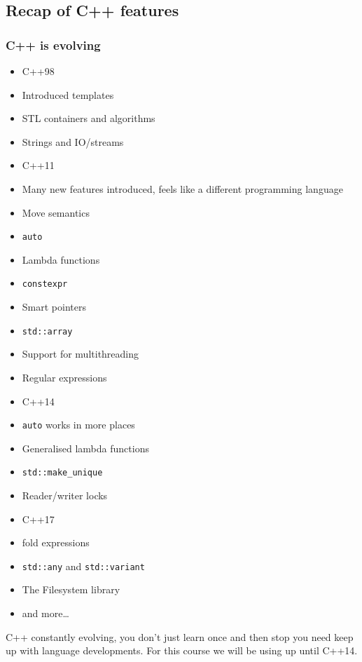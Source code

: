 \subsection{Recap of C++ features}\label{recap-of-c-features}

\subsubsection{C++ is evolving}\label{c-is-evolving}

\begin{itemize}
\itemsep1pt\parskip0pt
\item
  C++98
\item
  Introduced templates
\item
  STL containers and algorithms
\item
  Strings and IO/streams\\
\item
  C++11
\item
  Many new features introduced, feels like a different programming
  language
\item
  Move semantics
\item
  \texttt{auto}
\item
  Lambda functions
\item
  \texttt{constexpr}
\item
  Smart pointers
\item
  \texttt{std::array}
\item
  Support for multithreading
\item
  Regular expressions
\item
  C++14
\item
  \texttt{auto} works in more places
\item
  Generalised lambda functions
\item
  \texttt{std::make\_unique}
\item
  Reader/writer locks
\item
  C++17
\item
  fold expressions
\item
  \texttt{std::any} and \texttt{std::variant}
\item
  The Filesystem library
\item
  and more\ldots{}
\end{itemize}

C++ constantly evolving, you don't just learn once and then stop you
need keep up with language developments. For this course we will be
using up until C++14.

